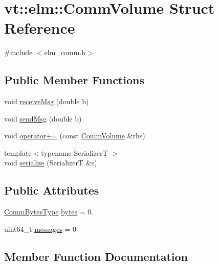 \hypertarget{structvt_1_1elm_1_1_comm_volume}{}\section{vt\+:\+:elm\+:\+:Comm\+Volume Struct Reference}
\label{structvt_1_1elm_1_1_comm_volume}


{\ttfamily \#include $<$elm\+\_\+comm.\+h$>$}

\subsection*{Public Member Functions}
\begin{DoxyCompactItemize}
\item 
void \hyperlink{structvt_1_1elm_1_1_comm_volume_a40d4193cba31026a4083406b9208a001}{receive\+Msg} (double b)
\item 
void \hyperlink{structvt_1_1elm_1_1_comm_volume_a05073c834f400fbebc4086091da4837e}{send\+Msg} (double b)
\item 
void \hyperlink{structvt_1_1elm_1_1_comm_volume_ab89752b4538bef37e2e03ffee6409804}{operator+=} (const \hyperlink{structvt_1_1elm_1_1_comm_volume}{Comm\+Volume} \&rhs)
\item 
{\footnotesize template$<$typename SerializerT $>$ }\\void \hyperlink{structvt_1_1elm_1_1_comm_volume_ab10a0dbdfa3ec7637ed904bd92a6f0fb}{serialize} (SerializerT \&s)
\end{DoxyCompactItemize}
\subsection*{Public Attributes}
\begin{DoxyCompactItemize}
\item 
\hyperlink{namespacevt_1_1elm_a6005d029f0531d2809076ce7186416bf}{Comm\+Bytes\+Type} \hyperlink{structvt_1_1elm_1_1_comm_volume_a3dc5194d74ff2c45e8cc941e3bff4a35}{bytes} = 0.
\item 
uint64\+\_\+t \hyperlink{structvt_1_1elm_1_1_comm_volume_a401827dc013273393db0ef10f6bfedd0}{messages} = 0
\end{DoxyCompactItemize}


\subsection{Member Function Documentation}
\mbox{\label{structvt_1_1elm_1_1_comm_volume_ab89752b4538bef37e2e03ffee6409804}} 
